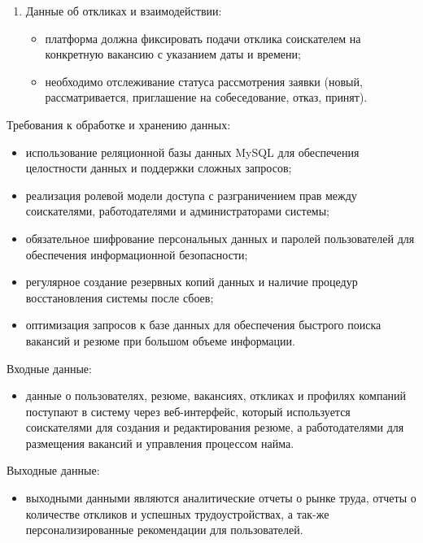 \begin{enumerate}
\begin{itemize}
		\item должны содержать информацию о компании-работодателе, контактные данные;
		\item необходима категоризация по сферам деятельности, типу занятости, уровню позиции и географическому расположению.
	\end{itemize}
	\item Данные об откликах и взаимодействии:
	\begin{itemize}
		\item платформа должна фиксировать подачи отклика соискателем на конкретную вакансию с указанием даты и времени;
		\item необходимо отслеживание статуса рассмотрения заявки (новый, рассматривается, приглашение на собеседование, отказ, принят).
	\end{itemize}
\end{enumerate}

Требования к обработке и хранению данных:

\begin{itemize}
	\item использование реляционной базы данных MySQL для обеспечения целостности данных и поддержки сложных запросов;
	\item реализация ролевой модели доступа с разграничением прав между соискателями, работодателями и администраторами системы;
	\item обязательное шифрование персональных данных и паролей пользователей для обеспечения информационной безопасности;
	\item регулярное создание резервных копий данных и наличие процедур восстановления системы после сбоев;
	\item оптимизация запросов к базе данных для обеспечения быстрого поиска вакансий и резюме при большом объеме информации.
\end{itemize}
	
Входные данные:

\begin{itemize}
	\item данные о пользователях, резюме, вакансиях, откликах и профилях компаний поступают в систему через веб-интерфейс, который используется соискателями для создания и редактирования резюме, а работодателями для размещения вакансий и управления процессом найма.
\end{itemize}

Выходные данные:

\begin{itemize}
	\item выходными данными являются аналитические отчеты о рынке труда, отчеты о количестве откликов и успешных трудоустройствах, а так-же персонализированные рекомендации для пользователей.
\end{itemize}

